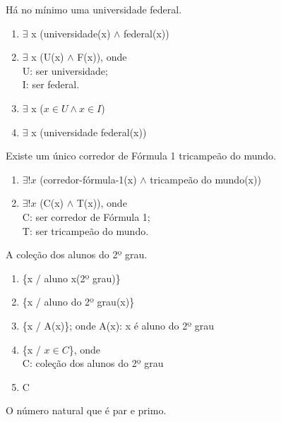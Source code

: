 \bigskip
\begin{exemplo} Há no mínimo uma universidade federal.
 \end{exemplo}

\begin{enumerate}[label=(\roman*)]
    \item $\exists$ x (universidade(x) $\wedge$ federal(x))
    \item $\exists$ x (U(x) $\wedge$ F(x)), onde\\
    U: ser universidade;\\
    I: ser federal.
    \item $\exists$ x ($x \in U \wedge x \in I$)
    \item $\exists$ x (universidade federal(x))
\end{enumerate}

\bigskip
\begin{exemplo} Existe um único corredor de Fórmula 1 tricampeão do mundo.
\end{exemplo}

\begin{enumerate}[label=(\roman*)]
    \item $\exists!x$ (corredor-fórmula-1(x) $\wedge$ tricampeão do mundo(x))
    \item $\exists!x$ (C(x) $\wedge$ T(x)), onde\\
    C: ser corredor de Fórmula 1;\\
    T: ser tricampeão do mundo.
\end{enumerate}

\bigskip
\begin{exemplo} A coleção dos alunos do 2º grau.
\end{exemplo}

\begin{enumerate}[label=(\roman*)]
    \item \{x / aluno x(2º grau)\}
    \item \{x / aluno do 2º grau(x)\}
    \item \{x / A(x)\}; onde A(x): x é aluno do 2º grau
    \item \{x / $x \in C$\}, onde\\
    C: coleção dos alunos do 2º grau
    \item C
\end{enumerate}

\bigskip
\begin{exemplo} O número natural que é par e primo.
\end{exemplo}


